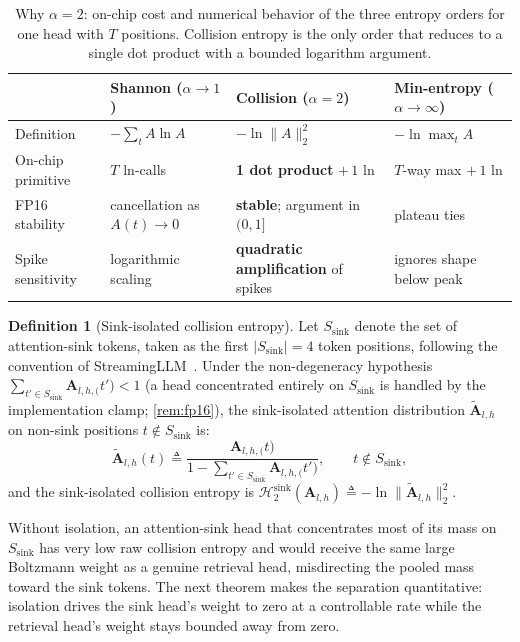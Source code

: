 \documentclass[final,5p,times,twocolumn]{elsarticle}
\theoremstyle{definition}
\newtheorem{definition}{Definition}
\theoremstyle{remark}
\newcommand{\Attn}[2]{\mathbf{A}_{#1,#2}}
\newcommand{\CollisionSink}[1]{\mathcal{H}^{\mathrm{sink}}_{2}\!\left(#1\right)}
\newcommand{\Ssink}{S_{\mathrm{sink}}}
\begin{document}
\begin{table}[t]
\centering\small
\caption{Why $\alpha = 2$: on-chip cost and numerical behavior of the
  three entropy orders for one head with $T$ positions. Collision
  entropy is the only order that reduces to a single dot product with a
  bounded logarithm argument.}
\label{tab:alpha_primitives}
\begin{tabular}{@{}p{}p{}
                 p{}p{}@{}}
\toprule
 & Shannon ($\alpha{\to}1$) & Collision ($\alpha{=}2$) &
 Min-entropy ($\alpha{\to}\infty$) \\
\midrule
Definition & $-\sum_t A\ln A$ & $-\ln\|A\|_2^2$ & $-\ln\max_t A$ \\
On-chip primitive & $T$ ln-calls & \textbf{1 dot product} $+\,1$ ln &
 $T$-way max $+\,1$ ln \\
FP16 stability & cancellation as $A(t)\to 0$ & \textbf{stable};
 argument in $(0,1]$ & plateau ties \\
Spike sensitivity & logarithmic scaling & \textbf{quadratic
 amplification} of spikes & ignores shape below peak \\
\bottomrule
\end{tabular}
\end{table}

\begin{definition}[Sink-isolated collision entropy]
\label{def:sinkentropy}
Let $\Ssink$ denote the set of attention-sink tokens, taken as the first
 $|\Ssink| = 4$ token positions, following the convention of
StreamingLLM~\cite{xiao2024streamingllm}. Under the non-degeneracy
hypothesis $\sum_{t' \in \Ssink}\Attn{l,h}(t') < 1$ (a head concentrated
entirely on $\Ssink$ is handled by the implementation clamp;
\cref{rem:fp16}), the sink-isolated attention distribution
 $\tilde{\mathbf{A}}_{l,h}$ on non-sink positions $t \notin \Ssink$ is:
\begin{equation}
\tilde{\mathbf{A}}_{l,h}(t)
\triangleq \frac{\Attn{l,h}(t)}
{1 - \sum_{t' \in \Ssink} \Attn{l,h}(t')},
\qquad t \notin \Ssink,
\label{eq:sink_isolated_dist}
\end{equation}
and the sink-isolated collision entropy is
 $\CollisionSink{\Attn{l}{h}} \triangleq
-\ln \|\tilde{\mathbf{A}}_{l,h}\|_2^2$.
\end{definition}

Without isolation, an attention-sink head that concentrates most of its
mass on $\Ssink$ has very low raw collision entropy and would receive
the same large Boltzmann weight as a genuine retrieval head, misdirecting
the pooled mass toward the sink tokens. The next theorem makes the
separation quantitative: isolation drives the sink head's weight to
zero at a controllable rate while the retrieval head's weight stays
bounded away from zero.
\end{document}
